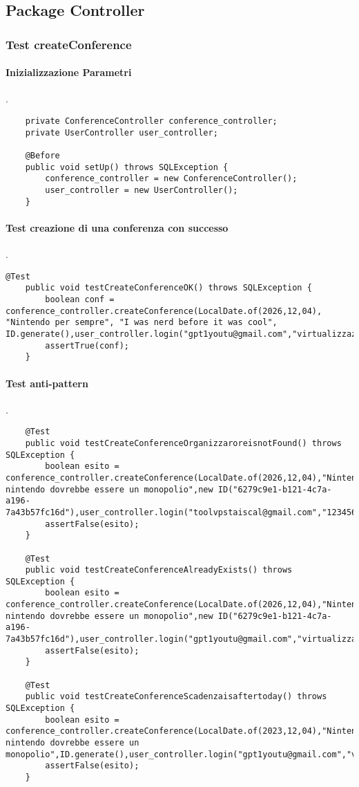 \subsection{Package Controller}
\label{sec:test_unita_package_controller}

\subsubsection{Test createConference}
\paragraph{Inizializzazione Parametri}
.
\begin{lstlisting}
    private ConferenceController conference_controller;
    private UserController user_controller;

    @Before
    public void setUp() throws SQLException {
        conference_controller = new ConferenceController();
        user_controller = new UserController();
    }
\end{lstlisting}
\paragraph{Test creazione di una conferenza con successo}
.
\begin{lstlisting}
@Test
    public void testCreateConferenceOK() throws SQLException {
        boolean conf = conference_controller.createConference(LocalDate.of(2026,12,04), "Nintendo per sempre", "I was nerd before it was cool", ID.generate(),user_controller.login("gpt1youtu@gmail.com","virtualizzazione"));
        assertTrue(conf);
    }
\end{lstlisting}
\paragraph{Test anti-pattern }
.
\begin{lstlisting}
    @Test
    public void testCreateConferenceOrganizzaroreisnotFound() throws SQLException {
        boolean esito = conference_controller.createConference(LocalDate.of(2026,12,04),"Nintendo","Perche nintendo dovrebbe essere un monopolio",new ID("6279c9e1-b121-4c7a-a196-7a43b57fc16d"),user_controller.login("toolvpstaiscal@gmail.com","12345678!"));
        assertFalse(esito);
    }

    @Test
    public void testCreateConferenceAlreadyExists() throws SQLException {
        boolean esito = conference_controller.createConference(LocalDate.of(2026,12,04),"Nintendo","Perche nintendo dovrebbe essere un monopolio",new ID("6279c9e1-b121-4c7a-a196-7a43b57fc16d"),user_controller.login("gpt1youtu@gmail.com","virtualizzazione"));
        assertFalse(esito);
    }

    @Test
    public void testCreateConferenceScadenzaisaftertoday() throws SQLException {
        boolean esito = conference_controller.createConference(LocalDate.of(2023,12,04),"Nintendo","Perche nintendo dovrebbe essere un monopolio",ID.generate(),user_controller.login("gpt1youtu@gmail.com","virtualizzazione"));
        assertFalse(esito);
    }
\end{lstlisting}

